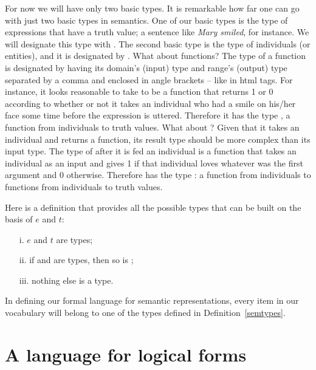 \documentclass[11pt,a4paper,draft]{article}
\begin{document}
For now we will have only two basic types. It is remarkable how far one can go with just two basic types in semantics. One of our basic types is the type of expressions that have a truth value; a sentence like \emph{Mary smiled}, for instance. We will designate this type with . The second basic type is the type of individuals (or entities), and it is designated by . What about functions? The type of a function is designated by having its domain's (input) type and range's (output) type separated by a comma and enclosed in angle brackets -- like in html tags. For instance, it looks reasonable to take  to be a function that returns 1 or 0 according to whether or not it takes an individual who had a smile on his/her face some time before the expression is uttered. Therefore it has the type , a function from individuals to truth values. What about ? Given that it takes an individual and returns a function, its result type should be more complex than its input type. The type of  after it is fed an individual is a function that takes an individual as an input and gives 1 if that individual loves whatever was the first argument and 0 otherwise. Therefore  has the type : a function from individuals to functions from individuals to truth values.

Here is a definition that provides all the possible types that can be built on the basis of $e$ and $t$:

\begin{udefinition}\label{semtypes}
\begin{enumerate}
\item[]
\item[i.] $e$ and $t$ are types; 
\item[ii.] if \sysm{\alpha} and \sysm{\beta} are types, then so is \smtyp{\alpha}{\beta}; 
\item[iii.]  nothing else is a type.
\end{enumerate}
\end{udefinition}

In defining our formal language for semantic representations, every item in our vocabulary will belong to one of the types defined in Definition~\ref{semtypes}.

\section{A language for logical forms}
\end{document}
